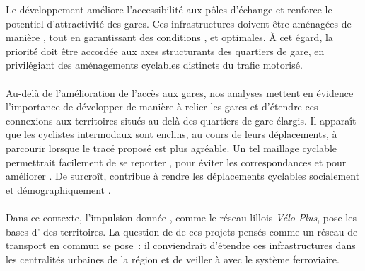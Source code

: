 \documentclass[../main.tex]{subfiles}
\begin{document}
    \begin{multicols}{2}
    \raggedcolumns
    \small{
Le développement  améliore l’accessibilité aux pôles d’échange et renforce le potentiel d'attractivité des gares. Ces infrastructures doivent être aménagées de manière , tout en garantissant des conditions ,  et  optimales. À cet égard, la priorité doit être accordée aux axes structurants des quartiers de gare, en privilégiant des aménagements cyclables distincts du trafic motorisé.
    \\\\
Au-delà de l'amélioration de l'accès aux gares, nos analyses mettent en évidence l’importance de développer  de manière à relier les gares et d’étendre ces connexions aux territoires situés au-delà des quartiers de gare élargis. Il apparaît que les cyclistes intermodaux sont enclins, au cours de leurs déplacements, à parcourir  lorsque le tracé proposé est plus agréable. Un tel maillage cyclable permettrait facilement de se reporter , pour éviter les correspondances et pour améliorer . De surcroît,  contribue à rendre les déplacements cyclables socialement et démographiquement .
    \\\\
Dans ce contexte, l'impulsion donnée , comme le réseau lillois \textsl{Vélo Plus}, pose les bases d' des territoires. La question de  de ces projets pensés comme un réseau de transport en commun se pose~: il conviendrait d'étendre ces infrastructures dans les centralités urbaines de la région et de veiller à  avec le système ferroviaire.
    }
    \end{multicols}

    
\end{document}
